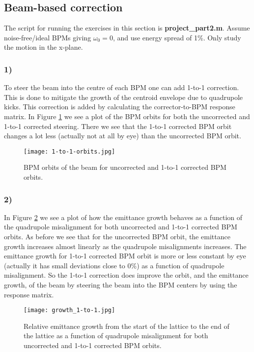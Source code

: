\documentclass[12pt,a4paper,english]{article}
\begin{document}
\subsection*{Beam-based correction}
\label{subsect:Beam correction}
The script for running the exercises in this section is \textbf{project\_part2.m}. Assume noise-free/ideal BPMs giving $\omega_0=0$, and use energy spread of 1\%. Only study the motion in the x-plane.
\subsubsection*{1)}
To steer the beam into the centre of each BPM one can add 1-to-1 correction. This is done to mitigate the growth of the centroid envelope due to quadrupole kicks. This correction is added by calculating the corrector-to-BPM response matrix. In Figure \ref{fig:1-to-1_orbit} we see a plot of the BPM orbits for both the uncorrected and 1-to-1 corrected steering. There we see that the 1-to-1 corrected BPM orbit changes a lot less (actually not at all by eye) than the uncorrected BPM orbit.

\begin{figure}[htbp!]
	\centering\texttt{[image: 1-to-1-orbits.jpg]}
	\caption{BPM orbits of the beam for uncorrected and 1-to-1 corrected BPM orbits. \label{fig:1-to-1_orbit}}
\end{figure} 

\subsubsection*{2)}
In Figure \ref{fig:em_growth_1to1} we see a plot of how the emittance growth behaves as a function of the quadrupole misalignment for both uncorrected and 1-to-1 corrected BPM orbits. As before we see that for the uncorrected BPM orbit, the emittance growth increases almost linearly as the quadrupole misalignments increases. The emittance growth for 1-to-1 corrected BPM orbit is more or less constant by eye (actually it has small deviations close to 0\%) as a function of quadrupole misalignment. So the 1-to-1 correction does improve the orbit, and the emittance growth, of the beam by steering the beam into the BPM centers by using the response matrix.

\begin{figure}[htbp!]
	\centering\texttt{[image: growth\_1-to-1.jpg]}
	\caption{Relative emittance growth from the start of the lattice to the end of the lattice as a function of quadrupole misalignment for both uncorrected and 1-to-1 corrected BPM orbits. \label{fig:em_growth_1to1}}
\end{figure} 
\end{document}
